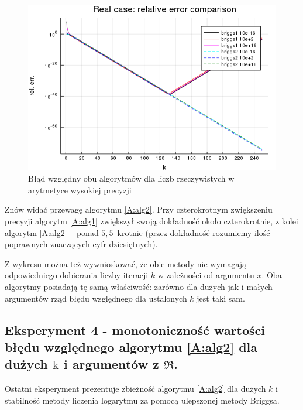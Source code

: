 \documentclass{article}
\begin{document}
	\begin{figure}[h]
	\includegraphics[scale=0.6]{exp3.png}
	\caption{Błąd względny obu algorytmów dla liczb rzeczywistych w arytmetyce wysokiej precyzji}
	\label{fig:exp3}
	\end{figure}

Znów widać przewagę algorytmu \ref{A:alg2}. Przy czterokrotnym zwiększeniu precyzji algorytm \ref{A:alg1} zwiększył swoją dokładność około czterokrotnie, z kolei algorytm \ref{A:alg2} -- ponad $5,5$--krotnie (przez dokładność rozumiemy ilość poprawnych znaczących cyfr dziesiętnych). 

Z wykresu można też wywnioskować, że obie metody nie wymagają odpowiedniego dobierania liczby iteracji $k$ w zależności od argumentu $x$. Oba algorytmy posiadają tę samą właściwość: zarówno dla dużych jak i małych argumentów rząd błędu względnego dla ustalonych $k$ jest taki sam.

\pagebreak
	\subsection{Eksperyment 4 - monotoniczność wartości błędu względnego algorytmu \ref{A:alg2} dla dużych $\mathrm{k}$ i argumentów z $\Re$.}
	Ostatni eksperyment prezentuje zbieżność algorytmu \ref{A:alg2} dla dużych $k$ i stabilność metody liczenia logarytmu za pomocą ulepszonej metody Briggsa.
\end{document}
